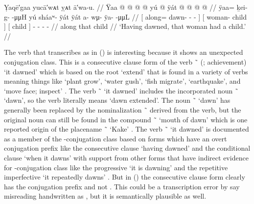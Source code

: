
\ex\label{ex:94-11-dawn-woman-have-child}%
%
\begingl
	\glpreamble	Ỵaqē′gaa yucā′wᴀt ỵᴀt ā′wa-u. //
	\gla	{} Ÿaa  @ {} @ {} @ {} @ {} {}
		{} yú  @ {} {}
		{} ÿát {} 
		 @ {} @ {} @ {} @ {} //
	\glb	{} ÿaa= ḵei- g-  -μμH {} {}
		{} yú sháaʷ- ÿát {}
		{} ÿát {}
		a- wμ- ÿa-  -μμL //
	\glc	{}[ along= dawn- -  - \· {}]
		{}[  woman- child {}]
		{}[ child {}]
		- - -  - //
	\gld	{} along  {} {} {} {} {}
		{} that  {} {}
		{} child {}
		 {} {} {} {} //
	\glft	‘Having dawned, that woman had a child.’
		//
\endgl
\xe

The verb that \citeauthor{swanton:1909} transcribes as  in (\lastx) is interesting because it shows an unexpected conjugation class.
This is a consecutive clause form of the verb  \~\  (; achievement) ‘it dawned’ which is based on the root  ‘extend’ that is found in a variety of verbs meaning things like ‘plant grow’, ‘water gush’, ‘fish migrate’, ‘earthquake’, and ‘move face; inspect’ \parencite[72–78]{leer:1976}.
The verb  \~\  ‘it dawned’ includes the incorporated noun  \~\  ‘dawn’, so the verb literally means ‘dawn extended’.
The noun  \~\  ‘dawn’ has generally been replaced by the nominalization  \~\  derived from the verb, but the original noun can still be found in the compound  \~\  ‘mouth of dawn’ which is one reported origin of the placename  \~\  ‘Kake’ \parencites{hope:2003}[123]{thornton:2012}.
The verb  \~\  ‘it dawned’ is documented as a member of the -conjugation class based on forms which have an overt  conjugation prefix like the consecutive clause  ‘having dawned’ and the conditional clause  ‘when it dawns’ \parencite[02/10]{leer:1973} with support from other forms that have indirect evidence for -conjugation class like the progressive  ‘it is dawning’ and the repetitive imperfective  ‘it repeatedly dawns’ \parencite[3]{leer:1963}.
But in (\lastx) the consecutive clause form  clearly has the  conjugation prefix and not .
This could be a transcription error by say misreading handwritten  as , but it is semantically plausible as well.

